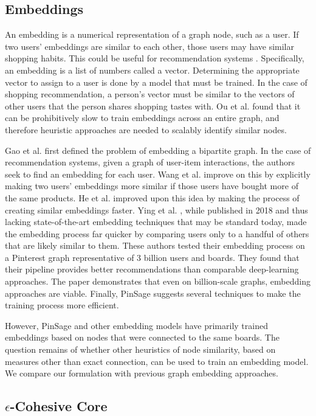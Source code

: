 \documentclass[conference]{IEEEtran}
\begin{document}
\subsection{Embeddings}

An embedding is a numerical representation of a graph node, such as a user. If two users' embeddings are similar to each other, those users may have similar shopping habits. This could be useful for recommendation systems \cite{ou2026}. Specifically, an embedding is a list of numbers called a vector. Determining the appropriate vector to assign to a user is done by a model that must be trained. In the case of shopping recommendation,  a person's vector must be similar to the vectors of other users that the person shares shopping tastes with. Ou et al. \cite{ou2026} found that it can be prohibitively slow to train embeddings across an entire graph, and therefore heuristic approaches are needed to scalably identify similar nodes. 

Gao et al. \cite{gao2018} first defined the problem of embedding a bipartite graph. In the case of recommendation systems, given a graph of user-item interactions, the authors seek to find an embedding for each user. Wang et al. \cite{wang2019} improve on this by explicitly making two users' embeddings more similar if those users have bought more of the same products. He et al. \cite{he2020} improved upon this idea by making the process of creating similar embeddings faster. Ying et al. \cite{ying2018}, while published in 2018 and thus lacking state-of-the-art embedding techniques that may be standard today, made the embedding process far quicker by comparing users only to a handful of others that are likely similar to them. These authors tested their embedding process on a Pinterest graph representative of 3 billion users and boards. They found that their pipeline provides better recommendations than comparable deep-learning approaches. The paper demonstrates that even on billion-scale graphs, embedding approaches are viable. Finally, PinSage suggests several techniques to make the training process more efficient.

However, PinSage and other embedding models have primarily trained embeddings based on nodes that were connected to the same boards. The question remains of whether other heuristics of node similarity, based on measures other than exact connection, can be used to train an embedding model. We compare our formulation with previous graph embedding approaches.

\subsection{$\epsilon$-Cohesive Core}
\end{document}
